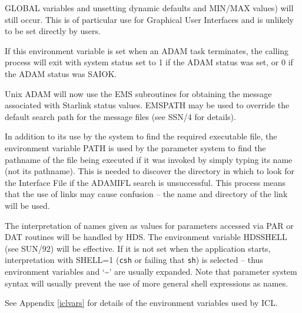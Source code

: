\documentclass[twoside,11pt]{article}
\newcommand{\xref}[3]{#1}
\renewcommand{\_}{\texttt{\symbol{95}}}
\begin{document}
\begin{description}
GLOBAL variables and unsetting dynamic defaults and MIN/MAX values) will still
occur.
This is of particular use for Graphical User Interfaces and is unlikely
to be set directly by users.
\item[ADAM\_EXIT] If this environment variable is set when an ADAM task
terminates, the calling process will exit with system status set to 1 if
the ADAM status was set, or 0 if the ADAM status was SAI\_\_OK.
\item[EMS\_PATH] Unix ADAM will now use the EMS subroutines for obtaining the
message associated with Starlink status values. EMS\_PATH may be used to 
override the default search path for the message files 
(see 
\xref{SSN/4}{ssn4}{operating_system_specific_routines}
for details).
\item[PATH] In addition to its use by the system to find the required
executable file, the environment variable PATH is used by the parameter
system to find the pathname of the file being executed if it was invoked by 
simply typing its name (not its pathname).
This is needed to discover the directory in which to look for the Interface 
File if the ADAM\_IFL search is unsuccessful.
This process means that the use of links may cause confusion -- the name
and directory of the link will be used.
\item[HDS\_SHELL] The interpretation of names given as values for parameters
accessed via PAR or DAT routines will be handled by HDS.
The environment variable HDS\_SHELL 
(see 
\xref{SUN/92}{sun92}{HDS_SHELL_tuning_parameter}) 
will be effective.
If it is not set when the application starts, interpretation with SHELL=1
(\texttt{csh} or failing that \texttt{sh}) is selected 
-- thus environment variables and `\~{}' are usually expanded.
Note that parameter system syntax will usually prevent the use of more general 
shell expressions as names.
\item[ICL Environment Variables] See Appendix \ref{iclvars} for details of the
environment variables used by ICL.
\end{description}
\end{document}
